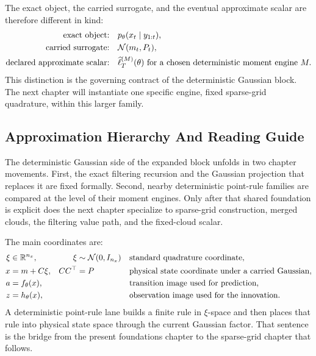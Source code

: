 The exact object, the carried surrogate, and the eventual approximate scalar are
therefore different in kind:
\begin{equation}
\begin{aligned}
  \text{exact object:}
  &\quad p_\theta(x_t\mid y_{1:t}), \\
  \text{carried surrogate:}
  &\quad \mathcal{N}(m_t,P_t), \\
  \text{declared approximate scalar:}
  &\quad \widehat\ell_T^{(M)}(\theta)
  \text{ for a chosen deterministic moment engine } M.
\end{aligned}
  \label{eq:bf-hd-gq-exact-vs-approximate-summary}
\end{equation}
This distinction is the governing contract of the deterministic Gaussian block.
The next chapter will instantiate one specific engine, fixed sparse-grid
quadrature, within this larger family.

\subsection{Approximation Hierarchy And Reading Guide}
\label{sec:bf-hd-gq-hierarchy}

The deterministic Gaussian side of the expanded block unfolds in two chapter
movements.  First, the exact filtering recursion and the Gaussian projection that
replaces it are fixed formally.  Second, nearby deterministic point-rule families
are compared at the level of their moment engines.  Only after that shared
foundation is explicit does the next chapter specialize to sparse-grid
construction, merged clouds, the filtering value path, and the fixed-cloud
scalar.

The main coordinates are:
\begin{align}
  \xi &\in \mathbb{R}^{n_x},
  &\xi&\sim\mathcal{N}(0,I_{n_x})
  &&\hbox{standard quadrature coordinate},
  \label{eq:bf-hd-gq-standard-coordinate}\\
  x &= m+C\xi,
  &CC^\top&=P
  &&\hbox{physical state coordinate under a carried Gaussian},
  \label{eq:bf-hd-gq-physical-coordinate}\\
  a &= f_\theta(x),
  &&
  &&\hbox{transition image used for prediction},
  \label{eq:bf-hd-gq-transition-coordinate}\\
  z &= h_\theta(x),
  &&
  &&\hbox{observation image used for the innovation}.
  \label{eq:bf-hd-gq-observation-coordinate}
\end{align}
A deterministic point-rule lane builds a finite rule in \(\xi\)-space and then
places that rule into physical state space through the current Gaussian factor.
That sentence is the bridge from the present foundations chapter to the
sparse-grid chapter that follows.


